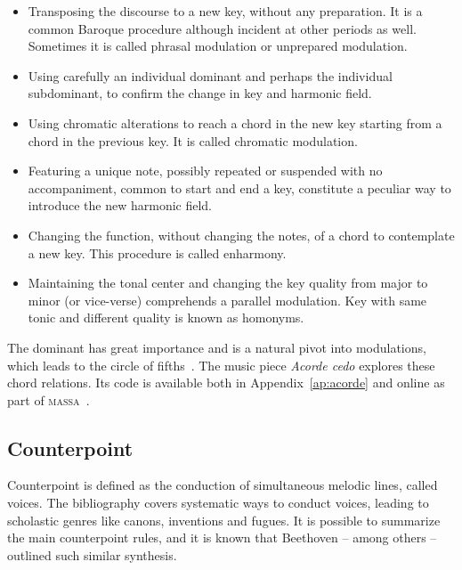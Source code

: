 \documentclass[
 aip,
 jmp,
 amsmath,amssymb,
 reprint,
]{revtex4-1}
\newcommand{\massa}{{\large \textsc{massa}}}
\begin{document}
\begin{itemize}
    \item Transposing the discourse to a new key, without any preparation. It is
    a common Baroque procedure although incident at other periods as well. Sometimes it is 
    called phrasal modulation or unprepared modulation.
    \item  Using carefully an individual dominant and perhaps the individual
    subdominant, to confirm the change in key and harmonic field.
    \item Using chromatic alterations to reach a chord in the new key starting from a
    chord in the previous key. It is called chromatic modulation.
    \item Featuring a unique note, possibly repeated or suspended with no
    accompaniment, common to start and end a key, constitute a peculiar way
    to introduce the new harmonic field.
    \item Changing the function, without changing the notes, of a chord to
    contemplate a new key. This procedure is called enharmony.
    \item Maintaining the tonal center and changing the key quality from major to minor
    (or vice-verse) comprehends a parallel modulation. Key with same tonic and
    different quality is known as homonyms.
\end{itemize}

The dominant has great importance and is a natural pivot into modulations,
which leads to the circle of fifths~\cite{Harmonia,Salzer,Koellheuteur,Harmony}. 
The music piece \emph{Acorde cedo} explores these chord relations. Its code is
available both in Appendix~\ref{ap:acorde} and online as part of \massa~\cite{MASSA}.


\subsection{Counterpoint}\label{subsec:contraponto}

Counterpoint is defined as the conduction of simultaneous melodic lines, called voices. The bibliography covers systematic ways to conduct voices, leading to scholastic genres like canons, inventions and fugues. It is possible to
summarize the main counterpoint rules, and it is known that Beethoven --
among others -- outlined such similar synthesis.
\end{document}
